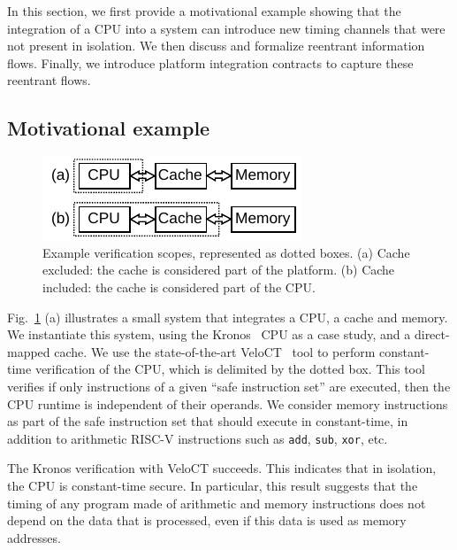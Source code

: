 In this section, we first provide a motivational example showing that the integration of a CPU into a system can introduce new timing channels that were not present in isolation.
We then discuss and formalize reentrant information flows.
Finally, we introduce platform integration contracts to capture these reentrant flows.

\subsection{Motivational example}

\begin{figure}[t]
    \begin{center}
    \includegraphics[width=0.6\columnwidth]{figures/verifscopecache/verifscopecache.pdf}
    \end{center}
    \vspace*{-1em}
    \caption{\label{fig:verifscopecache}
        Example verification scopes, represented as dotted boxes. (a) Cache excluded: the cache is considered part of the platform. (b) Cache included: the cache is considered part of the CPU.
    }
    \vspace*{-1em}
\end{figure}


Fig.~\ref{fig:verifscopecache} (a) illustrates a small system that integrates a CPU, a cache and memory.
We instantiate this system, using the Kronos~\cite{kronos} CPU as a case study, and a direct-mapped cache.
We use the state-of-the-art VeloCT~\cite{dinesh2025h} tool to perform constant-time verification of the CPU, which is delimited by the dotted box.
This tool verifies if only instructions of a given ``safe instruction set'' are executed, then the CPU runtime is independent of their operands.
We consider memory instructions as part of the safe instruction set that should execute in constant-time, in addition to arithmetic RISC-V instructions such as \texttt{add}, \texttt{sub}, \texttt{xor}, etc.

The Kronos verification with VeloCT succeeds.
This indicates that in isolation, the CPU is constant-time secure.
In particular, this result suggests that the timing of any program made of arithmetic and memory instructions does not depend on the data that is processed, even if this data is used as memory addresses.

